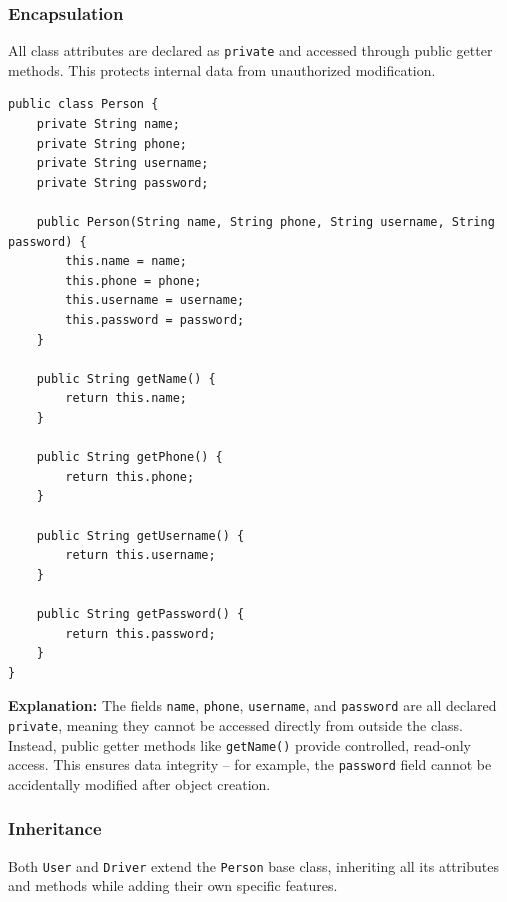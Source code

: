 \documentclass[fonts]{icst}
\begin{document}
\subsubsection{Encapsulation}

All class attributes are declared as \texttt{private} and accessed through public getter methods. This protects internal data from unauthorized modification.

\begin{lstlisting}[caption={Encapsulation in Person.java -- private fields with public getters}]
public class Person {
    private String name;
    private String phone;
    private String username;
    private String password;

    public Person(String name, String phone, String username, String password) {
        this.name = name;
        this.phone = phone;
        this.username = username;
        this.password = password;
    }

    public String getName() {
        return this.name;
    }

    public String getPhone() {
        return this.phone;
    }

    public String getUsername() {
        return this.username;
    }

    public String getPassword() {
        return this.password;
    }
}
\end{lstlisting}

\textbf{Explanation:} The fields \texttt{name}, \texttt{phone}, \texttt{username}, and \texttt{password} are all declared \texttt{private}, meaning they cannot be accessed directly from outside the class. Instead, public getter methods like \texttt{getName()} provide controlled, read-only access. This ensures data integrity -- for example, the \texttt{password} field cannot be accidentally modified after object creation.

\subsubsection{Inheritance}

Both \texttt{User} and \texttt{Driver} extend the \texttt{Person} base class, inheriting all its attributes and methods while adding their own specific features.
\end{document}
